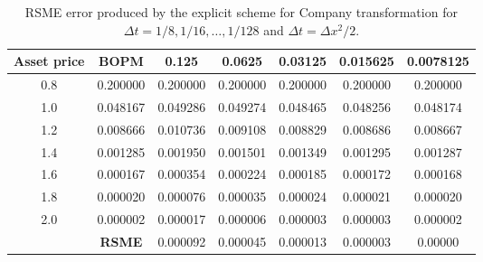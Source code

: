 \begin{table}[H]
    \centering
    \begin{tabular}{@{}ccccccc@{}}
    \toprule
    \textbf{Asset price} & \textbf{BOPM} & 0.125    & 0.0625   & 0.03125  & 0.015625 & 0.0078125 \\ \midrule
    0.8                  & 0.200000      & 0.200000 & 0.200000 & 0.200000 & 0.200000 & 0.200000  \\
    1.0                  & 0.048167      & 0.049286 & 0.049274 & 0.048465 & 0.048256 & 0.048174  \\
    1.2                  & 0.008666      & 0.010736 & 0.009108 & 0.008829 & 0.008686 & 0.008667  \\
    1.4                  & 0.001285      & 0.001950 & 0.001501 & 0.001349 & 0.001295 & 0.001287  \\
    1.6                  & 0.000167      & 0.000354 & 0.000224 & 0.000185 & 0.000172 & 0.000168  \\
    1.8                  & 0.000020      & 0.000076 & 0.000035 & 0.000024 & 0.000021 & 0.000020  \\
    2.0                  & 0.000002      & 0.000017 & 0.000006 & 0.000003 & 0.000003 & 0.000002  \\
    & \textbf{RSME} & 0.000092 & 0.000045 & 0.000013 & 0.000003 & 0.00000   \\ \bottomrule
    \end{tabular}
    \caption{\label{tab:rsme_explicit_company_transformation}RSME error produced by the explicit scheme for Company transformation for $\Delta{t}=1/8,1/16,\dots,1/128$ and $\Delta{t}=\Delta{x}^2/2$.}
\end{table}


